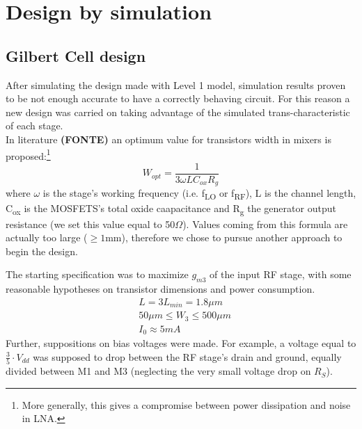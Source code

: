 \section{Design by simulation}

\subsection{Gilbert Cell design}
After simulating the design made with Level 1 model, simulation results proven to be not enough accurate to have a correctly behaving circuit.
For this reason a new design was carried on taking advantage of the simulated trans-characteristic of each stage.\\
In literature \textbf{(FONTE)} an optimum value for transistors width in mixers is proposed:\footnote{More generally, this gives a compromise between power dissipation and noise in LNA.}
\begin{equation}
W_{opt}=\frac{1}{3\omega L C_{ox} R_{g}}
\end{equation}
where $\omega$ is the stage's working frequency (i.e. f\textsubscript{LO} or f\textsubscript{RF}), L is the channel length, C\textsubscript{ox} is the MOSFETS's total oxide caapacitance and R\textsubscript{g} the generator output resistance (we set this value equal to 50$\Omega$). Values coming from this formula are actually too large ($\ge1$mm), therefore we chose to pursue another approach to begin the design.

The starting specification was to maximize \(g_{m3}\) of the input RF stage, with some reasonable hypotheses on transistor dimensions and power consumption. 
\begin{align}
	&L=3 L_{min} = 1.8\mu m \nonumber\\
	&50 \mu m \le W_3 \le 500 \mu m \nonumber \\
	&I_0 \approx 5mA \nonumber 
\end{align}
Further, suppositions on bias voltages were made. For example, a voltage equal to \(\frac{3}{5}\cdot V_{dd}\) was supposed to drop between the RF stage's drain and ground, equally divided between M1 and M3 (neglecting the very small voltage drop on \(R_S\)). 

